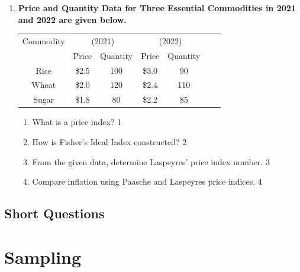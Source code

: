 \documentclass[a4paper,oneside]{book}
\begin{document}
\begin{enumerate}
  
  \begin{enumerate}
    \item
	What is an index number? \hfill 1
    \item
	How is the Marshall-Edgeworth Index formed? \hfill 2
    \item  
	From the given data, determine Paasche's quantity index number \hfill 3
    \item
	Analyze, using the cost of living index, whether price of daily necessities has increased.  \hfill 4
  \end{enumerate}

  
  \item
\textbf{Price and Quantity Data for Three Essential Commodities in 2021 and 2022 are given below.}

\begin{table}[h]
\centering
\begin{tabular}{ccccccc}
\hline
Commodity & \multicolumn{2}{c}{(2021)} & \multicolumn{2}{c}{(2022)}  \\
& Price & Quantity & Price & Quantity\\
\hline
Rice & \$2.5 & 100 & \$3.0 & 90  \\
Wheat & \$2.0 & 120 & \$2.4 & 110  \\
Sugar & \$1.8 & 80 & \$2.2 & 85 \\
\hline
\end{tabular}
\end{table}

\begin{enumerate}
    \item
    What is a price index? \hfill 1
    \item
    How is Fisher’s Ideal Index constructed? \hfill 2
    \item
    From the given data, determine Laspeyres’ price index number. \hfill 3
    \item
    Compare inflation using Paasche and Laspeyres price indices. \hfill 4
\end{enumerate}
    \end{enumerate}
\section{Short Questions}

\chapter{Sampling} 
\end{document}
